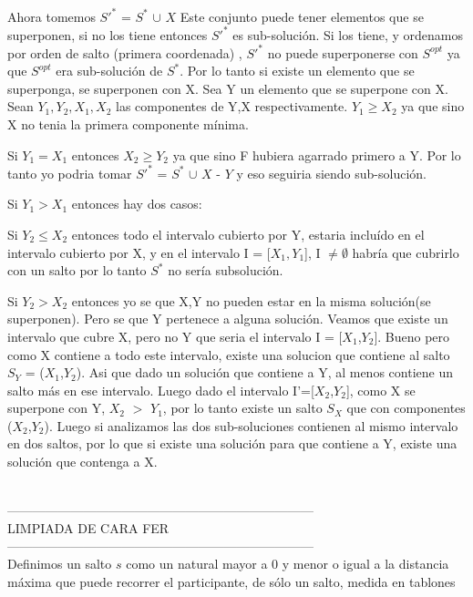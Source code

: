 Ahora tomemos $S'^{*}$ = $S^{*}$ $\cup$ ${X}$
Este conjunto puede tener elementos que se superponen, si no los tiene entonces 
$S'^{*}$ es sub-soluci\'on.
Si los tiene, y ordenamos por orden de salto (primera coordenada) , $S'^{*}$ no puede superponerse con $S^{opt}$ ya que $S^{opt}$ era sub-soluci\'on de $S^{*}$.
Por lo tanto si existe un elemento que se superponga, se superponen con X.
Sea Y un elemento que se superpone con X.
Sean $Y_{1},Y_{2},X_{1},X_{2}$ las componentes de Y,X respectivamente.
$Y_{1}\geq X_{2}$ ya que sino X no tenia la primera componente m\'inima.

Si $Y_{1} = X_{1}$ entonces $X_{2} \geq Y_{2}$ ya que sino F hubiera agarrado primero a Y. Por lo tanto yo podria tomar $S'^{*}$ = $S^{*}$ $\cup$ ${X}$ - ${Y}$ y eso seguiria siendo sub-soluci\'on.

Si $Y_{1} > X_{1}$ entonces hay dos casos:

Si $Y_{2} \leq X_{2}$ entonces todo el intervalo cubierto por Y, estaria inclu\'ido en el intervalo cubierto por X, y en el intervalo I = [$X_{1},Y_{1}$], I $\neq \emptyset$ habr\'ia que cubrirlo con un salto por lo tanto $S^{*}$ no ser\'ia subsoluci\'on.

Si $Y_{2} > X_{2}$ entonces yo se que X,Y no pueden estar en la misma soluci\'on(se superponen). Pero se que Y pertenece a alguna soluci\'on. Veamos que existe un intervalo que cubre X, pero no Y que seria el intervalo I = [$X_{1}$,$Y_{2}$].
Bueno pero como X contiene a todo este intervalo, existe una solucion que contiene al salto $S_{Y}$ = ($X_{1}$,$Y_{2}$). Asi que dado un soluci\'on que contiene a Y, al menos contiene un salto m\'as en ese intervalo.
Luego dado el intervalo I'=[$X_{2}$,$Y_{2}$], como X se superpone con Y, $X_{2}$ $>$ $Y_{1}$, por lo tanto existe un salto $S_{X}$ que con componentes ($X_{2}$,$Y_{2}$).
Luego si analizamos las dos sub-soluciones contienen al mismo intervalo en dos saltos, por lo que si existe una soluci\'on para que contiene a Y, existe una soluci\'on que contenga a X.  

\\
------------------------------------------------------------------------\\
LIMPIADA DE CARA FER\\
------------------------------------------------------------------------\\
Definimos un salto $s$ como un natural mayor a 0 y menor o igual a la distancia 
máxima que puede recorrer el participante, de sólo un salto, medida en tablones

